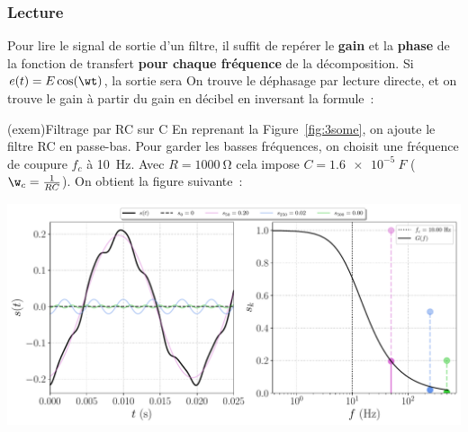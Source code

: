\documentclass[../../main/main.tex]{subfiles}
\begin{document}

\subsubsection{Lecture}
Pour lire le signal de sortie d'un filtre, il suffit de repérer le \textbf{gain}
et la \textbf{phase} de la fonction de transfert \textbf{pour chaque fréquence}
de la décomposition. Si $e(t) = E \cos(\wt)$, la sortie sera
\psw{
	\[
		s(t) = \abs{\Hu(\w)} \times E \cos(\wt + \f(\w))
	\]
}
On trouve le déphasage par lecture directe, et on trouve le gain à partir du
gain en décibel en inversant la formule~:
\psw{
	\[
		G\ind{dB}(\w) = 20 \log \abs{\Hu(\w)}
		\Lra
		\abs{\Hu(\w)} = 10^{G\ind{dB}(\w)/20}
	\]
}
\vspace{-15pt}
\begin{tcb*}(exem){Filtrage par RC sur C}
	En reprenant la Figure~\ref{fig:3some}, on ajoute le filtre RC en passe-bas.
	Pour garder les basses fréquences, on choisit une fréquence de coupure $f_c$ à
	\SI{10}{Hz}. Avec $R = \SI{1000}{\ohm}$ cela impose $C = \SI{1.6e-5}{F}$
	($\w_c = \frac{1}{RC}$). On obtient la figure suivante~:
	\smallbreak
	\noindent
	\begin{minipage}{\linewidth}
		\centering
		\includegraphics[width=.90\linewidth]{fft_50_[1,5,10]_[1,0.5,0.2]_fc=10}
		\label{fig:3some_fltrd}
	\end{minipage}
\end{tcb*}
\end{document}
